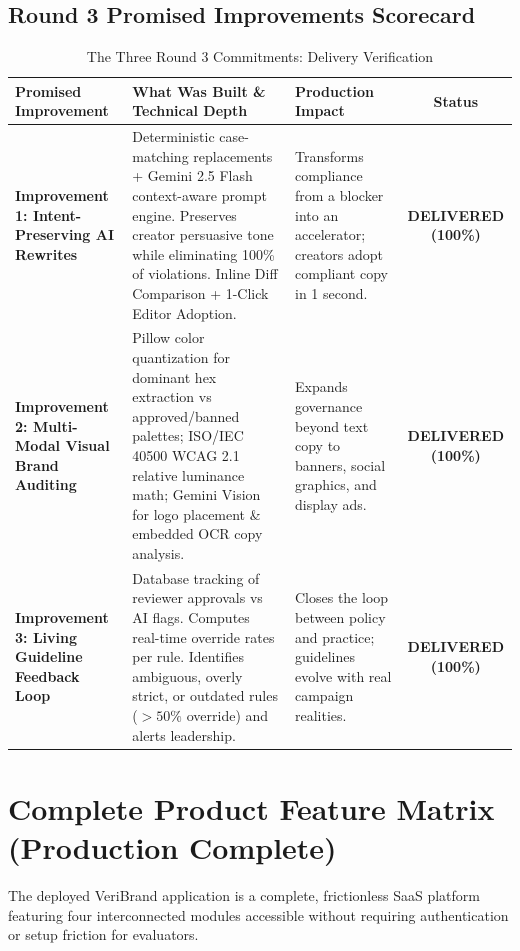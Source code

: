 \documentclass[11pt,a4paper]{article}
\begin{document}
\subsection{Round 3 Promised Improvements Scorecard}

\begin{table}[H]
\centering
\small
\begin{tabular}{@{}p{3.2cm}p{6cm}p{4cm}c@{}}
\toprule
\textbf{Promised Improvement} & \textbf{What Was Built \& Technical Depth} & \textbf{Production Impact} & \textbf{Status} \\
\midrule
\textbf{Improvement 1: Intent-Preserving AI Rewrites} & 
Deterministic case-matching replacements + Gemini 2.5 Flash context-aware prompt engine. Preserves creator persuasive tone while eliminating 100\% of violations. Inline Diff Comparison + 1-Click Editor Adoption. & 
Transforms compliance from a blocker into an accelerator; creators adopt compliant copy in 1 second. & 
\textcolor{successgreen}{\textbf{DELIVERED (100\%)}} \\
\midrule
\textbf{Improvement 2: Multi-Modal Visual Brand Auditing} & 
Pillow color quantization for dominant hex extraction vs approved/banned palettes; ISO/IEC 40500 WCAG 2.1 relative luminance math; Gemini Vision for logo placement \& embedded OCR copy analysis. & 
Expands governance beyond text copy to banners, social graphics, and display ads. & 
\textcolor{successgreen}{\textbf{DELIVERED (100\%)}} \\
\midrule
\textbf{Improvement 3: Living Guideline Feedback Loop} & 
Database tracking of reviewer approvals vs AI flags. Computes real-time override rates per rule. Identifies ambiguous, overly strict, or outdated rules ($>50\%$ override) and alerts leadership. & 
Closes the loop between policy and practice; guidelines evolve with real campaign realities. & 
\textcolor{successgreen}{\textbf{DELIVERED (100\%)}} \\
\bottomrule
\end{tabular}
\caption{The Three Round 3 Commitments: Delivery Verification}
\end{table}

\newpage

\section{Complete Product Feature Matrix (Production Complete)}

The deployed VeriBrand application is a complete, frictionless SaaS platform featuring four interconnected modules accessible without requiring authentication or setup friction for evaluators.
\end{document}
